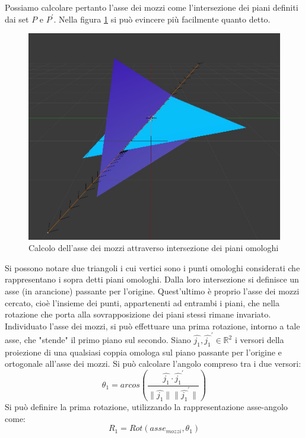 Possiamo calcolare pertanto l'asse dei mozzi come l'intersezione dei piani definiti dai set $P$ e $P^{'}$. Nella figura \ref{rot:gb:imgMozzi} si può evincere più facilmente quanto detto. 
\begin{figure}[h]
	\centering
	\includegraphics[width=420pt]{imgs/AsseMozzi.jpg}
	\caption{Calcolo dell'asse dei mozzi attraverso intersezione dei piani omologhi}
	\label{rot:gb:imgMozzi}
\end{figure} 

Si possono notare due triangoli i cui vertici sono i punti omologhi considerati che rappresentano i sopra detti piani omologhi. Dalla loro intersezione si definisce un asse (in arancione) passante per l'origine. Quest'ultimo è proprio l'asse dei mozzi cercato, cioè l'insieme dei punti, appartenenti ad entrambi i piani, che nella rotazione che porta alla sovrapposizione dei piani stessi rimane invariato.
Individuato l'asse dei mozzi, si può effettuare una prima rotazione, intorno a tale asse, che "stende" il primo piano sul secondo. Siano $\hat{j_1}, \hat{j_1}^{'} \in \mathbb{R}^2$ i versori della proiezione di una qualsiasi coppia omologa sul piano passante per l'origine e ortogonale all'asse dei mozzi. Si può calcolare l'angolo compreso tra i due versori:
\begin{equation}
	\theta_1 = arcos(\frac{\hat{j_1} \cdot \hat{j_1}^{'}}{\| \hat{j_1}\| \|\hat{j_1}^{'}\|})
\end{equation}
Si può definire la prima rotazione, utilizzando la rappresentazione asse-angolo come:
\begin{equation}
	R_1 = Rot(asse_{mozzi}, \theta_1)
\end{equation} 

